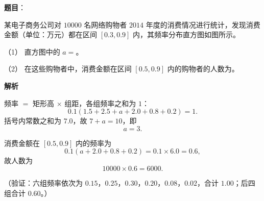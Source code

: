 \begin{answer}

\textbf{题目}：

某电子商务公司对 \(10000\) 名网络购物者 \(2014\) 年度的消费情况进行统计，发现消费金额（单位：万元）都在区间 \([0.3,0.9]\) 内，其频率分布直方图如图所示。

（1） 直方图中的 \(a=\)\gkblank{}。

（2） 在这些购物者中，消费金额在区间 \([0.5,0.9]\) 内的购物者的人数为\gkblank{}。
\nopagebreak[4]
\begin{center}\end{center}
\nopagebreak[4]
\textbf{解析}


频率 \(=\) 矩形高 \(\times\) 组距，各组频率之和为 \(1\)：
\nopagebreak[4]
\[
0.1\left(1.5+2.5+a+2.0+0.8+0.2\right)=1.
\]
括号内常数之和为 \(7.0\)，故 \(7+a=10\)，即
\nopagebreak[4]
\[
a=3.
\]


消费金额在 \([0.5,0.9]\) 内的频率为
\nopagebreak[4]
\[
0.1\left(a+2.0+0.8+0.2\right)=0.1\times6.0=0.6,
\]
故人数为
\nopagebreak[4]
\[
10000\times0.6=6000.
\]

（验证：六组频率依次为 \(0.15\)，\(0.25\)，\(0.30\)，\(0.20\)，\(0.08\)，\(0.02\)，合计 \(1.00\)；后四组合计 \(0.60\)。）



\end{answer}

